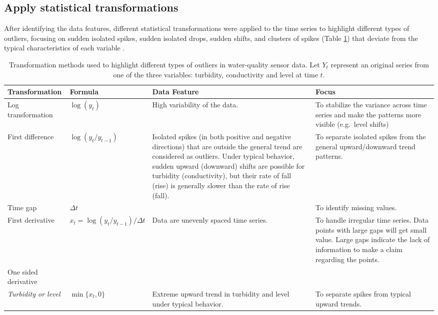 \documentclass[draft]{agujournal2018} %
\begin{document}
\subsection{Apply statistical transformations}\label{sec:trans}

After identifying the data features, different statistical
transformations were applied to the time series to highlight different
types of outliers, focusing on sudden isolated spikes, sudden isolated
drops, sudden shifts, and clusters of spikes (Table \ref{table:table_1})
that deviate from the typical characteristics of each variable
\citep{leigh2019framework}.

\begin{table}[!htbp]
\footnotesize
\caption{Transformation methods used to highlight different types of outliers in water-quality sensor data. Let $Y_t$ represent an original series from one of the three variables: turbidity, conductivity and level at time $t$.}
\label{table:table_1}
\tabcolsep=0.12cm
\begin{tabular}{p{3cm}p{3cm}p{4cm}p{4cm}}
\toprule
\textbf{Transformation}
  & \textbf{Formula}
  & \textbf{Data Feature}
  & \textbf{Focus} \\
\midrule
Log transformation
  & $\log(y_{t})$
  & High variability of the data.
  & To stabilize the variance across time series and make the patterns more visible (e.g.\ level shifts)
\\\midrule
First difference
  & $\log(y_{t} /y_{t-1})$
  & Isolated spikes (in both positive and negative directions) that are outside the general trend are considered as outliers. Under typical behavior, sudden upward (downward) shifts are possible for turbidity (conductivity), but their rate of fall (rise) is generally slower than the rate of rise (fall).
  & To separate isolated spikes from the general upward/downward trend patterns.
\\\midrule
Time gap
  & $\Delta t$
  &
  & To identify missing values.
\\\midrule
First derivative
  & $x_t = \log(y_{t} /y_{t-1}) / \Delta t$
  & Data are unevenly spaced time series.
  & To handle irregular time series. Data points with large gaps will get small value. Large gaps indicate the lack of information to make a claim regarding the points.
\\\midrule
One sided derivative
\\
\quad   \textit{Turbidity or level}
  & $\min\{x_t, 0\}$
  & Extreme upward trend in turbidity and level under typical behavior.
  & To separate spikes from typical upward trends. \\

\end{tabular}
\end{table}
\end{document}
